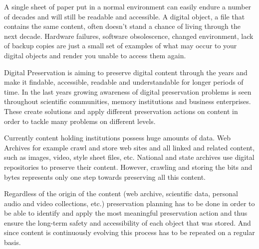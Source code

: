 A single sheet of paper put in a normal environment can easily endure a number of decades and will still be readable and accessible. A digital object, a file that contains the same content, often doesn't stand a chance of living through the next decade. Hardware failures, software obsolescence, changed environment, lack of backup copies are just a small set of examples of what may occur to your digital objects and render you unable to access them again.

Digital Preservation is aiming to preserve digital content through the years and make it findable, accessible, readable and understandable for longer periods of time. In the last years growing awareness of digital preservation problems is seen throughout scientific communities, memory institutions and business enterprises. These create solutions and apply different preservation actions on content in order to tackle many problems on different levels.

Currently content holding institutions possess huge amounts of data. Web Archives for example crawl and store web sites and all linked and related content, such as images, video, style sheet files, etc. National and state archives use digital repositories to preserve their content. However, crawling and storing the bits and bytes represents only one step towards preserving all this content. 

Regardless of the origin of the content (web archive, scientific data, personal audio and video collections, etc.) preservation planning has to be done in order to be able to identify and apply the most meaningful preservation action and thus ensure the long-term safety and accessibility of each object that was stored. And since content is continuously evolving this process has to be repeated on a regular basis.

